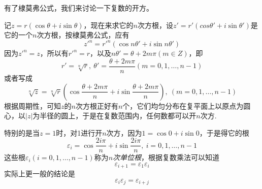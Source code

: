 有了棣莫弗公式，我们来讨论一下复数的开方。

记$z=r(\cos{\theta}+i\sin{\theta})$，现在来求它的$n$次方根，设$z'=r'(cos{\theta'+i\sin{\theta'}})$是它的一个$n$次方根，按棣莫弗公式，应有
\[ z'^n=r'^n(\cos{n\theta'}+i\sin{n\theta'}) \]
因为$z'^n=z$，所以有$r'^n=r$，以及$n\theta'=\theta+2m\pi(m \in Z)$，即
\[ r'=\sqrt[n]{r}, \  \theta'=\frac{\theta+2m\pi}{n}(m=0,1,\ldots,n-1) \]
或者写成
\[ \sqrt[n]{z}=\sqrt[n]{r} \left( \cos{\frac{\theta+2m\pi}{n}}+i\sin{\frac{\theta+2m\pi}{n}} \right), \  (m=0,1,\ldots,n-1) \]
根据周期性，可知$z$的$n$次方根正好有$n$个，它们均匀分布在复平面上以原点为圆心，以$|z|$为半径的圆上，于是在复数范围内，任何数都可以开$n$次方.


特别的是当$z=1$时，对1进行开$n$次方，因为$1=\cos{0}+i\sin{0}$，于是得它的根
\[ \varepsilon_i = \cos{\frac{2i\pi}{n}}+i\sin{\frac{2i\pi}{n}}, \  i=0,1,\ldots,n-1 \]
这些根$\varepsilon_i(i=0,1,\ldots,n-1)$称为\emph{$n$次单位根}，根据复数乘法可以知道
\[ \varepsilon_{i+1} = \varepsilon_1 \varepsilon_i \]
实际上更一般的结论是
\[ \varepsilon_i \varepsilon_j = \varepsilon_{i+j} \]


